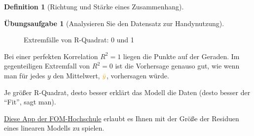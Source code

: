 \documentclass[
  a4paper,
  DIV=11]{scrreprt}
\theoremstyle{definition}
\newtheorem{exercise}{Übungsaufgabe}[chapter]
\theoremstyle{definition}
\theoremstyle{definition}
\newtheorem{definition}{Definition}[chapter]
\theoremstyle{remark}
\begin{document}
\begin{definition}[Richtung und Stärke eines
Zusammenhang]
\begin{exercise}[Analysieren Sie den Datensatz zur
Handynutzung]
\begin{figure}
\begin{minipage}{0.50\linewidth}


\end{minipage}%

\caption{\label{fig-r2-extreme}Extremfälle von R-Quadrat: 0 und 1}

\end{figure}%

Bei einer perfekten Korrelation \(R^2=1\) liegen die Punkte auf der
Geraden. Im gegenteiligen Extremfall von \(R^2=0\) ist die Vorhersage
genauso gut, wie wenn man für jedes \(y\) den Mittelwert,
\(\color{ycol}{\bar{y}}\), vorhersagen würde.

\begin{tcolorbox}[enhanced jigsaw, leftrule=.75mm, opacitybacktitle=0.6, colback=white, colframe=quarto-callout-note-color-frame, coltitle=black, colbacktitle=quarto-callout-note-color!10!white, opacityback=0, left=2mm, breakable, titlerule=0mm, toptitle=1mm, bottomtitle=1mm, rightrule=.15mm, title=\textcolor{quarto-callout-note-color}{\faInfo}\hspace{0.5em}{Hinweis}, arc=.35mm, bottomrule=.15mm, toprule=.15mm]

Je größer R-Quadrat, desto besser erklärt das Modell die Daten (desto
besser der ``Fit'', sagt man).

\end{tcolorbox}

\href{https://fomshinyapps.shinyapps.io/Variationszerlegung/}{Diese App
der FOM-Hochschule} erlaubt es Ihnen mit der Größe der Residuen eines
linearen Modells zu spielen.


\end{exercise}
\end{definition}
\end{document}
